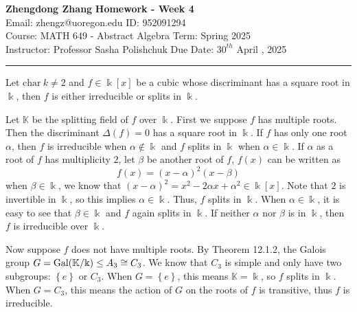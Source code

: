\documentclass[a4paper, 12pt]{article}
\begin{document}
\noindent

\large\textbf{Zhengdong Zhang} \hfill \textbf{Homework - Week 4} \\ 
Email: zhengz@uoregon.edu \hfill ID: 952091294 \\ 
\normalsize Course: MATH 649 - Abstract Algebra \hfill Term: Spring 2025 \\
Instructor: Professor Sasha Polishchuk \hfill Due Date: $30^{th}$ April , 2025 \\ 
\noindent\rule{7in}{2.8pt}

\begin{problem}{12.16}
Let \(\text{char}\  k\neq 2\) and \(f\in \Bbbk[x]\) be a cubic whose discriminant has a square root in \(\Bbbk\), then \(f\) is either irreducible or splits in \(\Bbbk\).
\end{problem}
\begin{solution}
Let \(\mathbb{K}\) be the splitting field of \(f\) over \(\Bbbk\). First we suppose \(f\) has multiple roots. Then the discriminant \(\Delta(f)=0\) has a square root in \(\Bbbk\). If \(f\) has only one root \(\alpha\), 
then \(f\) is irreducible when \(\alpha\notin \Bbbk\) and \(f\) splits in \(\Bbbk\) when \(\alpha\in \Bbbk\). If \(\alpha\) as a root of \(f\) has multiplicity \(2\), let \(\beta\) be another root of \(f\), \(f(x)\) can be written as 
\[f(x)=(x-\alpha)^2(x-\beta)\] 
when \(\beta\in \Bbbk\), we know that \((x-\alpha)^2=x^2-2\alpha x+\alpha^2\in \Bbbk[x]\). Note that \(2\) is invertible in \(\Bbbk\), so this implies \(\alpha\in \Bbbk\). Thus, \(f\) splits in \(\Bbbk\). When \(\alpha\in \Bbbk\), it is easy to see that \(\beta\in \Bbbk\) and \(f\) again splits in \(\Bbbk\). 
If neither \(\alpha\) nor \(\beta\) is in \(\Bbbk\), then \(f\) is irreducible over \(\Bbbk\).

Now suppose \(f\) does not have multiple roots. By Theorem 12.1.2, the Galois group \(G=\text{Gal}(\mathbb{K}/\Bbbk)\leq A_3\cong C_3\). We know that \(C_3\) is simple and only have two subgroups: \(\left\{ e \right\}\) or \(C_3\). When \(G=\left\{ e \right\}\), this means \(\mathbb{K}=\Bbbk\), so \(f\) splits in \(\Bbbk\). 
When \(G=C_3\), this means the action of \(G\) on the roots of \(f\) is transitive, thus \(f\) is irreducible. 
\end{solution}
\end{document}
